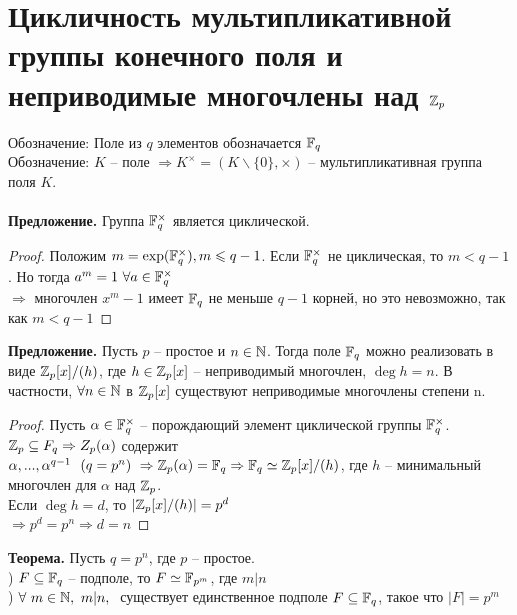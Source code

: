 \section{Цикличность мультипликативной группы конечного поля и неприводимые многочлены над $\mathbb{Z}_p$}

Обозначение: Поле из $q$ элементов обозначается $\mathbb{F}_q$\\
Обозначение: $K$ -- поле $\Rightarrow K^{\times}=\left( K\backslash\{0\}, \times \right) $ -- мультипликативная группа поля $K$.\\\\
\textbf{Предложение.} Группа $\mathbb{F}_q^{\times}$ является циклической.\\
\begin{proof}
    Положим $m=\exp(\mathbb{F}_q^{\times}), m\leqslant q-1$. Если $\mathbb{F}_q^{\times}$ не циклическая, то $m<q-1$. Но тогда $a^m=1\ \forall a\in \mathbb{F}_q^{\times}$\\
    $\Rightarrow $ многочлен $x^m-1$ имеет $\mathbb{F}_q$ не меньше $q-1$ корней, но это невозможно, так как $m<q-1$
\end{proof}
\noindent \textbf{Предложение.} Пусть $p$ -- простое и $n\in \mathbb{N}$. Тогда поле $\mathbb{F}_q$ можно реализовать в виде $\mathbb{Z}_p[x]/(h)$, где $h\in \mathbb{Z}_p[x]$ -- неприводимый многочлен, $\deg{h}=n$. В частности, $\forall n\in \mathbb{N}$ в $\mathbb{Z}_p[x]$ существуют неприводимые многочлены степени n.
\begin{proof}
    Пусть $\alpha \in \mathbb{F}_q^{\times}$ -- порождающий элемент циклической группы $\mathbb{F}_q^{\times}$. $\mathbb{Z}_p\subseteq F_q\Rightarrow Z_p(\alpha) $ содержит $\alpha,...,\alpha^{q-1}  \ \ (q=p^n) \ \Rightarrow\mathbb{Z}_p(\alpha)=\mathbb{F}_q\Rightarrow \mathbb{F}_q\simeq \mathbb{Z}_p[x]/(h)$, где $h$ -- минимальный многочлен для $\alpha$ над $\mathbb{Z}_p$.\\
    Если $\deg{h}=d$, то $\left| \mathbb{Z}_p[x]/(h) \right|=p^d$\\
    $\Rightarrow p^d=p^n\Rightarrow d=n$
\end{proof}
\noindent \textbf{Теорема.} Пусть $q=p^n$, где $p$ -- простое.\\
) $F\subseteq \mathbb{F}_q$ -- подполе, то $F\simeq \mathbb{F}_{p^m}$, где $m|n$\\
) $\forall \ m\in\mathbb{N}, \ m|n,\ $ существует единственное подполе $F\subseteq \mathbb{F}_q$, такое что $|F|=p^m$